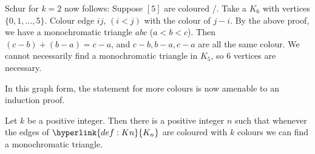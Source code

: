\documentclass{article}
\begin{document}
\begin{remark}
    Schur for $k=2$ now follows: Suppose $[5]$ are coloured /. Take a $K_6$ with vertices $\{0, 1, \dots, 5\}$. Colour edge $ij$, $(i<j)$ with the colour of $j-i$.
    By the above proof, we have a monochromatic triangle $abc$ ($a<b<c$). Then $(c-b) + (b-a) = c-a$, and $c-b, b-a, c-a$ are all the same colour.
    We cannot necessarily find a monochromatic triangle in $K_5$, so 6 vertices are necessary.

    \begin{center}
    \end{center}

    In this graph form, the statement for more colours is now amenable to an induction proof.
\end{remark}

\begin{nprop}\label{prop:1}
    Let $k$ be a positive integer.
    Then there is a positive integer $n$ such that whenever the edges of $\hyperlink{def:Kn}{K_n}$ are coloured with $k$ colours we can find a monochromatic triangle.
\end{nprop}

\end{document}
